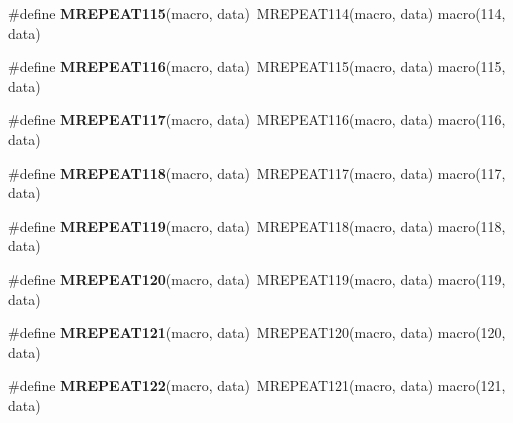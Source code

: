 \begin{DoxyCompactItemize}
\item 
\hypertarget{group__group__xmega__utils__mrepeat_ga065e40294f3d496aa0d661ef472f7914}{\#define {\bfseries M\-R\-E\-P\-E\-A\-T115}(macro, data)~M\-R\-E\-P\-E\-A\-T114(macro, data)   macro(114, data)}\label{group__group__xmega__utils__mrepeat_ga065e40294f3d496aa0d661ef472f7914}

\item 
\hypertarget{group__group__xmega__utils__mrepeat_gad60209ee8f18b1ecf655a810044966aa}{\#define {\bfseries M\-R\-E\-P\-E\-A\-T116}(macro, data)~M\-R\-E\-P\-E\-A\-T115(macro, data)   macro(115, data)}\label{group__group__xmega__utils__mrepeat_gad60209ee8f18b1ecf655a810044966aa}

\item 
\hypertarget{group__group__xmega__utils__mrepeat_gaa23405f68b33c1b3f14c3e45eb3f917a}{\#define {\bfseries M\-R\-E\-P\-E\-A\-T117}(macro, data)~M\-R\-E\-P\-E\-A\-T116(macro, data)   macro(116, data)}\label{group__group__xmega__utils__mrepeat_gaa23405f68b33c1b3f14c3e45eb3f917a}

\item 
\hypertarget{group__group__xmega__utils__mrepeat_ga74dc399001884d2f1f942b502ce2b9b6}{\#define {\bfseries M\-R\-E\-P\-E\-A\-T118}(macro, data)~M\-R\-E\-P\-E\-A\-T117(macro, data)   macro(117, data)}\label{group__group__xmega__utils__mrepeat_ga74dc399001884d2f1f942b502ce2b9b6}

\item 
\hypertarget{group__group__xmega__utils__mrepeat_ga0aeae0af7aeb117fb68f133cd352ff17}{\#define {\bfseries M\-R\-E\-P\-E\-A\-T119}(macro, data)~M\-R\-E\-P\-E\-A\-T118(macro, data)   macro(118, data)}\label{group__group__xmega__utils__mrepeat_ga0aeae0af7aeb117fb68f133cd352ff17}

\item 
\hypertarget{group__group__xmega__utils__mrepeat_ga4a67c3aed21abce662b2668e10a50d4b}{\#define {\bfseries M\-R\-E\-P\-E\-A\-T120}(macro, data)~M\-R\-E\-P\-E\-A\-T119(macro, data)   macro(119, data)}\label{group__group__xmega__utils__mrepeat_ga4a67c3aed21abce662b2668e10a50d4b}

\item 
\hypertarget{group__group__xmega__utils__mrepeat_ga75b16de882e5c30c0126c306e09d65c1}{\#define {\bfseries M\-R\-E\-P\-E\-A\-T121}(macro, data)~M\-R\-E\-P\-E\-A\-T120(macro, data)   macro(120, data)}\label{group__group__xmega__utils__mrepeat_ga75b16de882e5c30c0126c306e09d65c1}

\item 
\hypertarget{group__group__xmega__utils__mrepeat_ga002c52a2af11a3a25a748ab09f16a8f5}{\#define {\bfseries M\-R\-E\-P\-E\-A\-T122}(macro, data)~M\-R\-E\-P\-E\-A\-T121(macro, data)   macro(121, data)}\label{group__group__xmega__utils__mrepeat_ga002c52a2af11a3a25a748ab09f16a8f5}


\end{DoxyCompactItemize}

